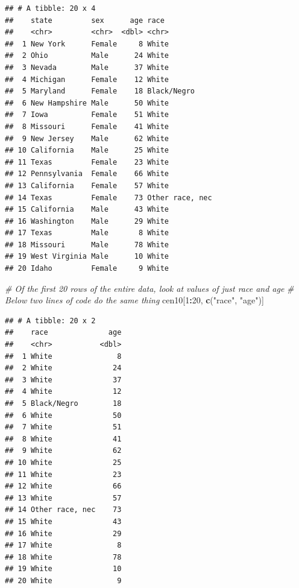 \documentclass[
]{book}
\newenvironment{Shaded}{\begin{snugshade}}{\end{snugshade}}
\newcommand{\CommentTok}[1]{\textcolor[rgb]{0.56,0.35,0.01}{\textit{#1}}}
\newcommand{\DecValTok}[1]{\textcolor[rgb]{0.00,0.00,0.81}{#1}}
\newcommand{\KeywordTok}[1]{\textcolor[rgb]{0.13,0.29,0.53}{\textbf{#1}}}
\newcommand{\NormalTok}[1]{#1}
\newcommand{\OperatorTok}[1]{\textcolor[rgb]{0.81,0.36,0.00}{\textbf{#1}}}
\newcommand{\StringTok}[1]{\textcolor[rgb]{0.31,0.60,0.02}{#1}}
\theoremstyle{definition}
\theoremstyle{definition}
\theoremstyle{definition}
\theoremstyle{remark}
\begin{document}
\begin{verbatim}
## # A tibble: 20 x 4
##    state         sex      age race           
##    <chr>         <chr>  <dbl> <chr>          
##  1 New York      Female     8 White          
##  2 Ohio          Male      24 White          
##  3 Nevada        Male      37 White          
##  4 Michigan      Female    12 White          
##  5 Maryland      Female    18 Black/Negro    
##  6 New Hampshire Male      50 White          
##  7 Iowa          Female    51 White          
##  8 Missouri      Female    41 White          
##  9 New Jersey    Male      62 White          
## 10 California    Male      25 White          
## 11 Texas         Female    23 White          
## 12 Pennsylvania  Female    66 White          
## 13 California    Female    57 White          
## 14 Texas         Female    73 Other race, nec
## 15 California    Male      43 White          
## 16 Washington    Male      29 White          
## 17 Texas         Male       8 White          
## 18 Missouri      Male      78 White          
## 19 West Virginia Male      10 White          
## 20 Idaho         Female     9 White
\end{verbatim}

\begin{Shaded}
\begin{Highlighting}[]
\CommentTok{\# Of the first 20 rows of the entire data, look at values of just race and age}
\CommentTok{\# Below two lines of code do the same thing}
\NormalTok{cen10[}\DecValTok{1}\OperatorTok{:}\DecValTok{20}\NormalTok{, }\KeywordTok{c}\NormalTok{(}\StringTok{"race"}\NormalTok{, }\StringTok{"age"}\NormalTok{)]}
\end{Highlighting}
\end{Shaded}

\begin{verbatim}
## # A tibble: 20 x 2
##    race              age
##    <chr>           <dbl>
##  1 White               8
##  2 White              24
##  3 White              37
##  4 White              12
##  5 Black/Negro        18
##  6 White              50
##  7 White              51
##  8 White              41
##  9 White              62
## 10 White              25
## 11 White              23
## 12 White              66
## 13 White              57
## 14 Other race, nec    73
## 15 White              43
## 16 White              29
## 17 White               8
## 18 White              78
## 19 White              10
## 20 White               9
\end{verbatim}
\end{document}
